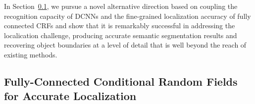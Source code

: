 In Section~\ref{sec:dense-crf}, we pursue a novel alternative direction based
on coupling the recognition capacity of DCNNs and the fine-grained
localization accuracy of fully connected CRFs and show that it is remarkably
successful in addressing the localication challenge, producing accurate
semantic segmentation results and recovering object boundaries at a level of
detail that is well beyond the reach of existing methods.  


\subsection{Fully-Connected Conditional Random Fields for Accurate Localization}
\label{sec:dense-crf}

